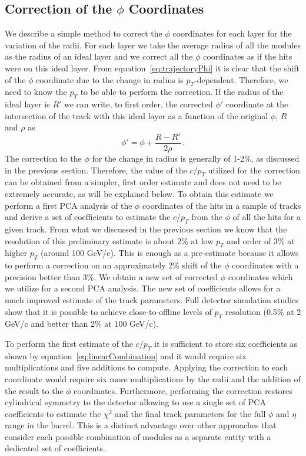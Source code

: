 \documentclass[10pt,a4paper]{report}
\begin{document}
\subsection{Correction of the $\phi$ Coordinates}

We describe a simple method to correct the $\phi$ coordinates for each layer for the variation of the radii. For each layer we take the average radius of all the modules as the radius of an ideal layer and we correct all the $\phi$ coordinates as if the hits were on this ideal layer. From equation~\ref{eq:trajectoryPhi} it is clear that the shift of the $\phi$ coordinate due to the change in radius is $p_T$-dependent. Therefore, we need to know the $p_T$ to be able to perform the correction. If the radius of the ideal layer is $R'$ we can write, to first order, the corrected $\phi'$ coordinate at the intersection of the track with this ideal layer as a function of the original $\phi$, $R$ and $\rho$ as
\begin{equation}
\phi' = \phi + \frac{R - R'}{2\rho}\, .
\end{equation}
The correction to the $\phi$ for the change in radius is generally of 1-2\%, as discussed in the previous section. Therefore, the value of the $c/p_T$ utilized for the correction can be obtained from a simpler, first order estimate and does not need to be extremely accurate, as will be explained below. To obtain this estimate we perform a first PCA analysis of the $\phi$ coordinates of the hits in a sample of tracks and derive a set of coefficients to estimate the $c/p_T$ from the $\phi$ of all the hits for a given track. From what we discussed in the previous section we know that the resolution of this preliminary estimate is about 2\% at low $p_T$ and order of 3\% at higher $p_T$ (around 100 GeV/c). This is enough as a pre-estimate because it allows to perform a correction on an approximately 2\% shift of the $\phi$ coordinates with a precision better than 3\%. We obtain a new set of corrected $\phi$ coordinates which we utilize for a second PCA analysis. The new set of coefficients allows for a much improved estimate of the track parameters. Full detector simulation studies show that it is possible to achieve close-to-offline levels of $p_T$ resolution (0.5\% at 2 GeV/c and better than 2\% at 100 GeV/c).

To perform the first estimate of the $c/p_T$ it is sufficient to store six coefficients as shown by equation~\ref{eq:linearCombination} and it would require six multiplications and five additions to compute. Applying the correction to each coordinate would require six more multiplications by the radii and the addition of the result to the $\phi$ coordinates. Furthermore, performing the correction restores cylindrical symmetry to the detector allowing to use a single set of PCA coefficients to estimate the $\chi^2$ and the final track parameters for the full $\phi$ and $\eta$ range in the barrel. This is a distinct advantage over other approaches that consider each possible combination of modules as a separate entity with a dedicated set of coefficients.
\end{document}
